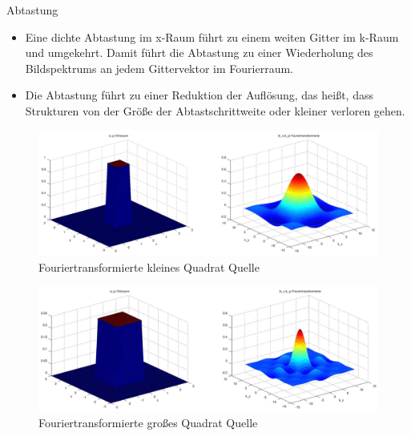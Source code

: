 \documentclass{beamer}
\begin{document}
	\begin{frame}{Abtastung}
	\begin{multicols}{2}
		\begin{itemize}
			\small\item Eine dichte Abtastung im x-Raum führt zu einem weiten Gitter im k-Raum und umgekehrt. Damit führt die Abtastung zu einer Wiederholung des Bildspektrums an jedem Gittervektor im Fourierraum.
			\item Die Abtastung führt zu einer Reduktion der Auflösung, das heißt, dass Strukturen von der Größe der Abtastschrittweite oder kleiner verloren gehen.
		\end{itemize}
		\begin{figure}
			\includegraphics[width=0.6\textheight]{abtast1.pdf}
			\caption{\tiny Fouriertransformierte kleines Quadrat Quelle\cite{fuchs}}
		\end{figure}
		\begin{figure}
			\includegraphics[width=0.6\textheight]{abtast2.pdf}
			\caption{\tiny Fouriertransformierte großes Quadrat Quelle\cite{fuchs}}
		\end{figure}
	\end{multicols}
	\end{frame}
\end{document}
